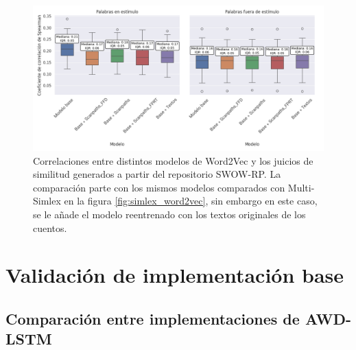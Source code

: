 \begin{figure}[htb]
    \centering
    \includegraphics[width=1\textwidth]{imagenes/swow_word2vec.png}
    \caption{Correlaciones entre distintos modelos de Word2Vec y los juicios de similitud 
    generados a partir del repositorio SWOW-RP. La comparación parte con los mismos modelos 
    comparados con Multi-Simlex en la figura \ref{fig:simlex_word2vec}, sin embargo en este caso, se le añade el 
    modelo reentrenado con los textos originales de los cuentos.}
    \label{fig:swow_word2vec}
\end{figure}



\section{Validación de implementación base}

\subsection{Comparación entre implementaciones de AWD-LSTM}

